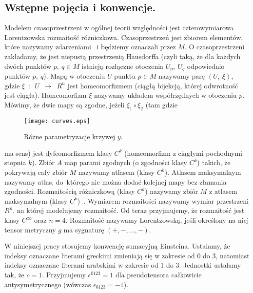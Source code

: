 \subsection{Wstępne pojęcia i konwencje.}
Modelem czasoprzestrzeni w 
ogólnej teorii względności jest czterowymiarowa Lorentzowska 
rozmaitość różniczkowa. 
Czasoprzestrzeń jest zbiorem elementów, które nazywamy 
zdarzeniami~\cite{trau1984} i będziemy oznaczali przez $M$.
O czasoprzestrzeni zakładamy, że jest
 niepustą przestrzenią Hausdorffa (czyli taką, że
dla każdych dwóch punktów $p,\ q\in M$ 
istnieją rozłączne otoczenia $U_p,\ U_q$ odpowiednio punktów $p,\ q$). 
Mapą w otoczeniu $U$ punktu $p\in M$ nazywamy parę $(U,\ \xi )$, gdzie  
$\xi$~$:$~$U$~$\to$~$R^n$ jest homeomorfizmem (ciągłą bijekcją, której 
odwrotność jest ciągła). 
Homeomorfizm $\xi$ nazywamy układem współrzędnych 
w otoczeniu $p$.
Mówimy, że dwie mapy są zgodne, jeżeli $\xi_1 \circ \xi_2$ (tam 
gdzie 
\begin{wrapfigure}[29]{r}{4cm}
\centering
\texttt{[image: curves.eps]}
\caption{Różne parametryzacje krzywej $y$.}
\end{wrapfigure}
ma 
sens)
jest dyfeomorfizmem klasy $C^k$ (homeomorfizm z 
ciągłymi pochodnymi stopnia $k$). 
Zbiór $A$ map
 parami zgodnych (o zgodności klasy $C^k$) 
takich, że pokrywają cały zbiór $M$ nazywamy 
atlasem (klasy $C^k$). Atlasem maksymalnym nazywamy atlas, do~którego
nie można dodać kolejnej mapy bez złamania zgodności.
Rozmaitością różniczkową (klasy $C^k$) nazywamy 
zbiór $M$ z atlasem maksymalnym (klasy $C^k$)~\cite{ganca1987}.
Wymiarem rozmaitości nazywamy wymiar przestrzeni $R^n$, na której 
modelujemy rozmaitość. Od teraz przyjmujemy, że rozmaitość 
jest klasy $C^\infty$ oraz $n=4$.
Rozmaitość nazywamy Lorentzowską, jeśli określony na niej tensor
metryczny $g$ ma sygnaturę $(+,-,\dots ,-)$.

W niniejszej pracy stosujemy konwencję sumacyjną Einsteina. Ustalamy, że 
indeksy oznaczane literami greckimi zmieniają się w zakresie od 0 do 3, 
natomiast indeksy oznaczane literami arabskimi 
w zakresie od 1 do 3. Jednostki ustalamy tak, że $c=1$.
Przyjmujemy $\epsilon^{0123}=1$ dla 
pseudotensora całkowicie 
antysymetrycznego (wówczas $\epsilon_{0123}=-1$).

